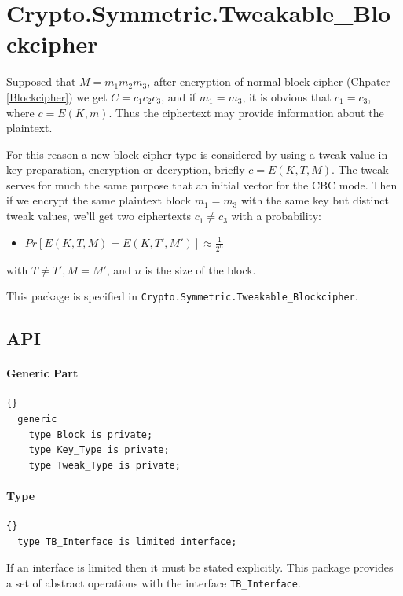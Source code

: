 \chapter{Crypto.Symmetric.Tweakable\_Blockcipher}
Supposed that $M=m_1m_2m_3$, after encryption of normal block cipher
(Chpater \ref{Blockcipher}) we get $C=c_1c_2c_3$, and if $m_1=m_3$, it
is obvious that $c_1=c_3$, where $c=E(K,m)$. Thus the ciphertext may
provide information about the plaintext.

For this reason a new block cipher type is considered by using a tweak
value in key preparation, encryption or decryption, briefly
$c=E(K,T,M)$. The tweak serves for much the same purpose that an
initial vector for the CBC mode. Then if we encrypt the same plaintext
block $m_1=m_3$ with the same key but distinct tweak values, we'll get
two ciphertexts $c_1\neq c_3$ with a probability:
\begin{itemize}
\item $Pr[E(K,T,M)=E(K,T',M')]\approx \frac{1}{2^n}$
\end{itemize}
with $T\neq T', M=M'$, and $n$ is the size of the block.

This package is specified in
\texttt{Crypto.Symmetric.Tweakable\_Blockcipher}.


\section{API}
\subsubsection*{Generic Part}
\begin{lstlisting}{}
  generic
    type Block is private;
    type Key_Type is private;
    type Tweak_Type is private;
\end{lstlisting}
\subsubsection*{Type}
\begin{lstlisting}{}
  type TB_Interface is limited interface;
\end{lstlisting}
If an interface is limited then it must be stated explicitly. This
package provides a set of abstract operations with the interface
\texttt{TB\_Interface}.

